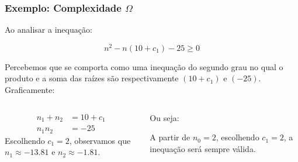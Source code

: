 \documentclass[10pt]{beamer}
\begin{document}
\begin{frame}[t]
    \frametitle{Exemplo: Complexidade $\Omega$}

    Ao analisar a inequação:

    $$n^2 - n(10+c_1) - 25    \geq 0$$

    Percebemos que se comporta como uma inequação do segundo grau no qual o produto e a soma das raízes são respectivamente $(10+c_1)$ e $(-25)$. Graficamente:

    \begin{center}

    \end{center}
    \begin{flushleft}
        \begin{columns}
            \begin{column}{0.45\textwidth}
                \begin{align*}
                    n_1 + n_2 & = 10+c_1 \\
                    n_1n_2    & = -25
                \end{align*}
                Escolhendo $c_1=2$, observamos que $n_1 \approx -13.81$ e $n_2 \approx -1.81$.
            \end{column}
            \begin{column}{0.45\textwidth}
                Ou seja:

                A partir de $n_0=2$, escolhendo $c_1=2$, a inequação será sempre válida.
            \end{column}
        \end{columns}
    \end{flushleft}
\end{frame}
\end{document}
